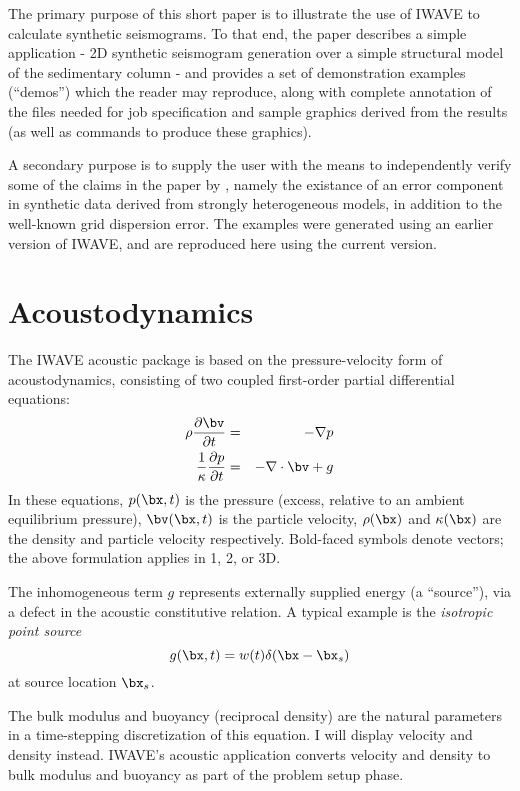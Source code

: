 The primary purpose of this short paper is to illustrate the use of
IWAVE to calculate synthetic seismograms. To that end, the paper
describes a simple application - 2D synthetic seismogram generation
over a simple structural model of the sedimentary column - and
provides a set of demonstration examples (``demos'') which the reader
may reproduce, along with complete annotation of the files needed for
job specification and sample graphics derived from the results (as
well as commands to produce these graphics).

A secondary purpose is to supply the user with the means to
independently verify some of the claims in the paper by
\cite{SymesVdovina:09}, namely the existance of an error component in
synthetic data derived from strongly heterogeneous models, in addition
to the well-known grid dispersion error. The examples were generated using an
earlier version of IWAVE, and are reproduced here using the current
version.



\section{Acoustodynamics}
The IWAVE acoustic package is based on the pressure-velocity form of
acoustodynamics, consisting of two coupled first-order partial
differential equations:
\begin{eqnarray}
\label{awe}
\rho \frac{\partial \bv}{\partial t} &=& - \nabla p \\
\frac{1}{\kappa}\frac{\partial p}{\partial t} &=& -\nabla \cdot \bv + g
\end{eqnarray}
In these equations, $p(\bx,t)$ is the pressure (excess, relative to an
ambient equilibrium pressure), $\bv(\bx,t)$ is the particle velocity,
$\rho(\bx)$ and $\kappa(\bx)$ are the density and particle velocity
respectively. Bold-faced symbols denote vectors; the above formulation
applies in 1, 2, or 3D.

The inhomogeneous term $g$ represents externally supplied energy (a
``source''), via a defect in the acoustic constitutive relation. A
typical example is the {\em isotropic point source}
\[
g(\bx,t) = w(t) \delta(\bx-\bx_s)
\]
at source location $\bx_s$.

The bulk modulus and buoyancy (reciprocal density) are the natural
parameters in a time-stepping discretization of this equation. I will
display velocity and density instead. IWAVE's acoustic application
converts velocity and density to bulk modulus and buoyancy as part of
the problem setup phase.

